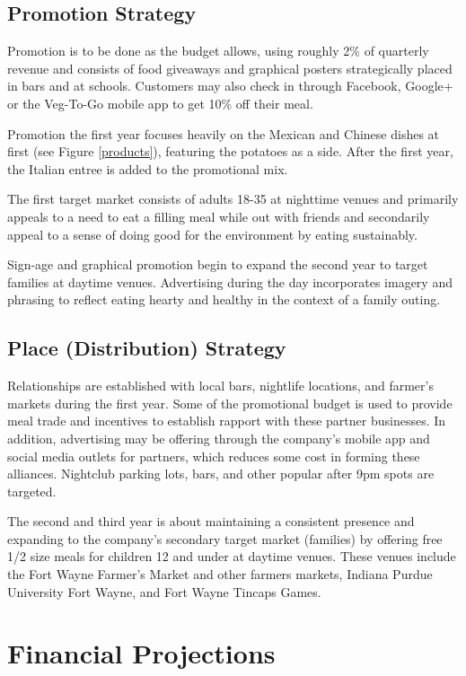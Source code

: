 \documentclass[12pt, letterpaper]{article}
\begin{document}
\subsection{Promotion Strategy}
Promotion is to be done as the budget allows, using roughly 2\% of quarterly revenue and consists of food giveaways and graphical posters strategically placed in bars and at schools.  Customers may also check in through Facebook, Google+ or the Veg-To-Go mobile app to get 10\% off their meal.

Promotion the first year focuses heavily on the Mexican and Chinese dishes at first (see Figure \ref{products}), featuring the potatoes as a side. After the first year, the Italian entree is added to the promotional mix.

The first target market consists of adults 18-35 at nighttime venues and primarily appeals to a need to eat a filling meal while out with friends and secondarily appeal to a sense of doing good for the environment by eating sustainably.

Sign-age and graphical promotion begin to expand the second year to target families at daytime venues.  Advertising during the day incorporates imagery and phrasing to reflect eating hearty and healthy in the context of a family outing.
\subsection{Place (Distribution) Strategy}
Relationships are established with local bars, nightlife locations, and farmer's markets during the first year.  Some of the promotional budget is used to provide meal trade and incentives to establish rapport with these partner businesses.  In addition, advertising may be offering through the company's mobile app and social media outlets for partners, which reduces some cost in forming these alliances.  Nightclub parking lots, bars, and other popular after 9pm spots are targeted.

The second and third year is about maintaining a consistent presence and expanding to the company's secondary target market (families) by offering free 1/2 size meals for children 12 and under at daytime venues.  These venues include the Fort Wayne Farmer's Market and other farmers markets, Indiana Purdue University Fort Wayne, and Fort Wayne Tincaps Games.

\section{Financial Projections}
\end{document}
